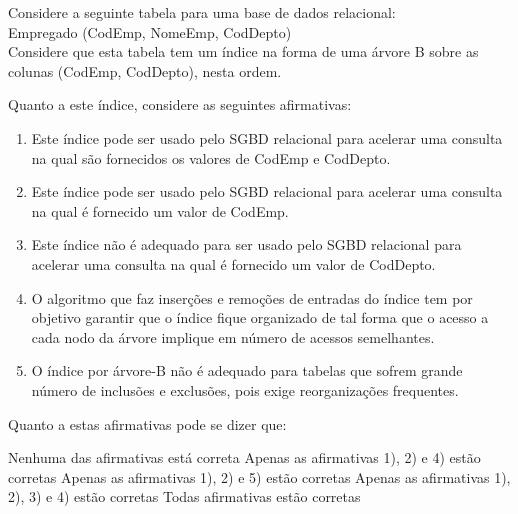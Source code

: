 \documentclass[12pt, addpoints]{exam}
\begin{document}
    \begin{questions}

    \newpage
    \question

Considere a seguinte tabela para uma base de dados relacional:\\

Empregado (CodEmp, NomeEmp, CodDepto)\\

Considere que esta tabela tem um índice na forma de uma árvore B sobre as colunas (CodEmp, CodDepto), nesta ordem.

Quanto a este índice, considere as seguintes afirmativas:

\begin{enumerate}

    \item Este índice pode ser usado pelo SGBD relacional para acelerar uma consulta na qual são fornecidos os valores de CodEmp e CodDepto.

    \item Este índice pode ser usado pelo SGBD relacional para acelerar uma consulta na qual é fornecido um valor de CodEmp.

    \item Este índice não é adequado para ser usado pelo SGBD relacional para acelerar uma consulta na qual é fornecido um valor de CodDepto.

    \item O algoritmo que faz inserções e remoções de entradas do índice tem por objetivo garantir que o índice fique organizado de tal forma que o acesso a cada nodo da árvore implique em número de acessos semelhantes.

    \item O índice por árvore-B não é adequado para tabelas que sofrem grande número de inclusões e exclusões, pois exige reorganizações frequentes.

\end{enumerate}





Quanto a estas afirmativas pode se dizer que:
\begin{choices}
\choice Nenhuma das afirmativas está correta
\choice Apenas as afirmativas 1), 2) e 4) estão corretas
\choice Apenas as afirmativas 1), 2) e 5) estão corretas
\choice Apenas as afirmativas 1), 2), 3) e 4) estão corretas
\choice Todas afirmativas estão corretas
\end{choices}


\end{questions}
\end{document}
